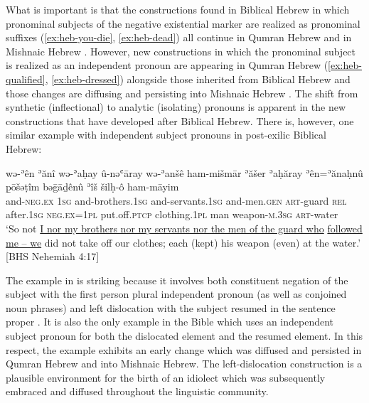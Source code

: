 \documentclass[output=paper,colorlinks,citecolor=brown,draft,draftmode]{langscibook}
\begin{document}
What is important is that the constructions found in Biblical Hebrew in
which pronominal subjects of the negative existential marker are realized
as pronominal suffixes (\ref{ex:heb-you-die}, \ref{ex:heb-dead}) all continue in Qumran Hebrew
 and in Mishnaic Hebrew . However, new
constructions in which the pronominal subject is realized as an independent
pronoun are appearing in Qumran Hebrew
(\ref{ex:heb-qualified}, \ref{ex:heb-dressed}) alongside those
inherited from Biblical Hebrew and those changes are diffusing and
persisting into Mishnaic Hebrew . The shift from synthetic
(inflectional) to analytic (isolating) pronouns is apparent in the new
constructions that have developed after Biblical Hebrew. There is, however,
one similar example with independent subject pronouns in post-exilic
Biblical Hebrew:
%
\begin{exe}\ex \label{ex:heb-weapon}
    \gll wə-ʾên ʾănî wə-ʾaḥay û-nəʿāray     wə-ʾanšê ham-mišmār ʾăšer
    ʾaḥăray    ʾên=ʾănaḥnû p̱ōšəṭîm bə\={g}āḏênû  ʾîš šilḥ-ô ham-māyim
    \\
  and-\textsc{neg.ex} \textsc{1sg} and-brothers.\textsc{1sg}
  and-servants.\textsc{1sg} and-men.\textsc{gen}  \textsc{art}-guard
  \textsc{rel}  after.\textsc{1sg}   \textsc{neg.ex}=\textsc{1pl}
  put.off.\textsc{ptcp}  clothing.\textsc{1pl}   man    
  weapon-\textsc{m.3sg}   \textsc{art}-water \\
    \glt `So not \uline{I nor my brothers nor my servants nor the men of the guard
    who} \uline{followed me – we} did not take off our clothes; each (kept) his
    weapon (even) at the water.' [BHS Nehemiah 4:17]
    \end{exe}%
%
The example in  is striking because it involves both
constituent negation of the subject with the first person plural
independent pronoun (as well as conjoined noun phrases) and left
dislocation with the subject resumed in the sentence proper 
\parencite[see][]{MillerNaude2015}. It is also the only example in the Bible
which uses an independent subject pronoun for both the dislocated element
and the resumed element. In this respect, the example exhibits an early
change which was diffused and persisted in Qumran Hebrew and into Mishnaic
Hebrew. The left-dislocation construction is a plausible environment for
the birth of an idiolect which was subsequently embraced and diffused
throughout the linguistic community. 
\end{document}
